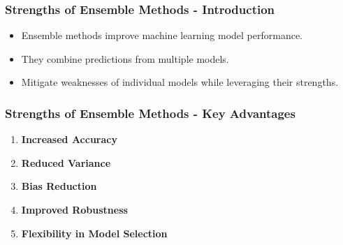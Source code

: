 \documentclass[aspectratio=169]{beamer}
\begin{document}
\begin{frame}[fragile]
    \frametitle{Strengths of Ensemble Methods - Introduction}
    \begin{itemize}
        \item Ensemble methods improve machine learning model performance.
        \item They combine predictions from multiple models.
        \item Mitigate weaknesses of individual models while leveraging their strengths.
    \end{itemize}
\end{frame}

\begin{frame}[fragile]
    \frametitle{Strengths of Ensemble Methods - Key Advantages}
    \begin{enumerate}
        \item \textbf{Increased Accuracy}
        \item \textbf{Reduced Variance}
        \item \textbf{Bias Reduction}
        \item \textbf{Improved Robustness}
        \item \textbf{Flexibility in Model Selection}
    \end{enumerate}
\end{frame}
\end{document}
